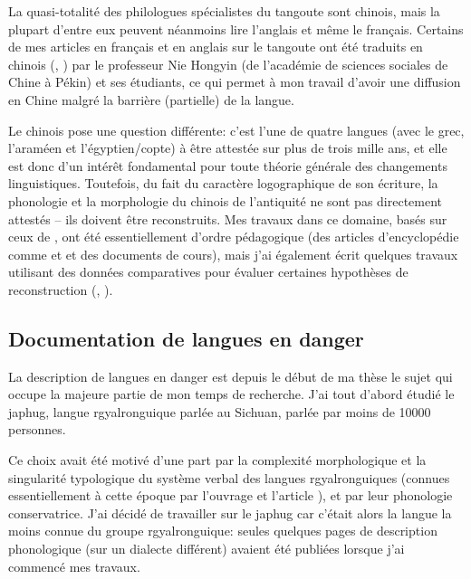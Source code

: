 \documentclass[oldfontcommands,oneside,a4paper,11pt]{article}
\begin{document}
La quasi-totalité des philologues spécialistes du tangoute sont chinois, mais la plupart d'entre eux peuvent néanmoins lire l'anglais et même le français. Certains de mes articles en français et en anglais sur le tangoute ont été traduits en chinois (\citealt{jacques08chuanshuo}, \citealt{jacques12chenghao}) par le professeur Nie Hongyin (de l'académie de sciences sociales de Chine à Pékin) et ses étudiants, ce qui permet à mon travail d'avoir une diffusion en Chine malgré la barrière (partielle) de la langue.


Le chinois pose une question différente: c'est l'une de quatre langues (avec le grec, l'araméen et l'égyptien/copte) à être attestée sur plus de trois mille ans, et elle est donc d'un intérêt  fondamental pour toute théorie générale des changements linguistiques. Toutefois, du fait du caractère  logographique de son écriture, la phonologie et la morphologie du chinois de l'antiquité ne sont pas directement attestés -- ils doivent être reconstruits. Mes travaux dans ce domaine, basés sur ceux de \citet{sagart99roc}, ont été essentiellement d'ordre pédagogique (des articles d'encyclopédie comme \citealt{jacques2015traditional} et  \citealt{jacques2015genetic} et des documents de cours), mais j'ai également écrit quelques travaux utilisant des données comparatives pour évaluer certaines hypothèses de reconstruction (\citealt{jacques00ywij}, \citealt{jacques05}).

\subsection{Documentation de langues en danger} \label{sec:documentation}
 
La description de langues en danger est depuis le début de ma thèse le sujet qui occupe la majeure partie de mon temps de recherche.  J'ai tout d'abord étudié le japhug, langue rgyalronguique parlée au Sichuan, parlée par moins de 10000 personnes.

Ce choix avait été motivé d'une part par la complexité morphologique et la singularité typologique du système verbal des langues rgyalronguiques (connues essentiellement à cette époque par l'ouvrage \citealt{linxr93jiarong} et l'article \citealt{jackson00sidaba}), et par leur phonologie conservatrice. J'ai décidé de travailler sur le japhug car c'était alors la langue la moins connue du groupe rgyalronguique:  seules quelques pages de description phonologique (sur un dialecte différent) avaient été publiées lorsque j'ai commencé mes travaux.
\end{document}
